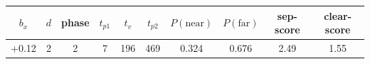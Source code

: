 \begin{tabular}{@{}cccccccccc@{}}
\toprule
$b_x$ & $d$ & phase & $t_{p1}$ & $t_v$ & $t_{p2}$ & $P(\mathrm{near})$ & $P(\mathrm{far})$ & sep-score & clear-score \\
\midrule
+0.12 & 2 & 2 & 7 & 196 & 469 & 0.324 & 0.676 & 2.49 & 1.55 \\
\bottomrule
\end{tabular}
